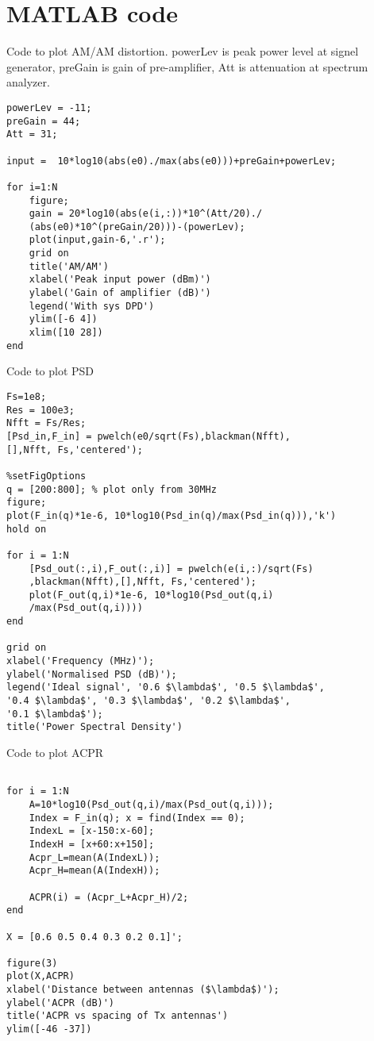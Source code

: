 \chapter{MATLAB code}\label{ch:appAlabel}

Code to plot AM/AM distortion. powerLev is peak power level at signel generator, preGain is gain of pre-amplifier, Att is attenuation at spectrum analyzer. 

\begin{lstlisting}[frame = single]
powerLev = -11;
preGain = 44;
Att = 31;

input =  10*log10(abs(e0)./max(abs(e0)))+preGain+powerLev;  

for i=1:N
    figure;
    gain = 20*log10(abs(e(i,:))*10^(Att/20)./
    (abs(e0)*10^(preGain/20)))-(powerLev);
    plot(input,gain-6,'.r');
    grid on
    title('AM/AM')
    xlabel('Peak input power (dBm)')
    ylabel('Gain of amplifier (dB)')
    legend('With sys DPD')
    ylim([-6 4])
    xlim([10 28])
end

\end{lstlisting}


Code to plot PSD

\begin{lstlisting}[frame = single]
Fs=1e8;
Res = 100e3;
Nfft = Fs/Res;
[Psd_in,F_in] = pwelch(e0/sqrt(Fs),blackman(Nfft),
[],Nfft, Fs,'centered');

%setFigOptions
q = [200:800]; % plot only from 30MHz
figure;
plot(F_in(q)*1e-6, 10*log10(Psd_in(q)/max(Psd_in(q))),'k')
hold on

for i = 1:N
    [Psd_out(:,i),F_out(:,i)] = pwelch(e(i,:)/sqrt(Fs)
    ,blackman(Nfft),[],Nfft, Fs,'centered');
    plot(F_out(q,i)*1e-6, 10*log10(Psd_out(q,i)
    /max(Psd_out(q,i))))
end

grid on
xlabel('Frequency (MHz)');
ylabel('Normalised PSD (dB)');
legend('Ideal signal', '0.6 $\lambda$', '0.5 $\lambda$', 
'0.4 $\lambda$', '0.3 $\lambda$', '0.2 $\lambda$', 
'0.1 $\lambda$');
title('Power Spectral Density')

\end{lstlisting}

Code to plot ACPR
\begin{lstlisting}[frame = single]

for i = 1:N
    A=10*log10(Psd_out(q,i)/max(Psd_out(q,i)));
    Index = F_in(q); x = find(Index == 0); 
    IndexL = [x-150:x-60];
    IndexH = [x+60:x+150];
    Acpr_L=mean(A(IndexL));
    Acpr_H=mean(A(IndexH));

    ACPR(i) = (Acpr_L+Acpr_H)/2;
end

X = [0.6 0.5 0.4 0.3 0.2 0.1]';

figure(3)
plot(X,ACPR)
xlabel('Distance between antennas ($\lambda$)');
ylabel('ACPR (dB)')
title('ACPR vs spacing of Tx antennas')
ylim([-46 -37])

\end{lstlisting}



